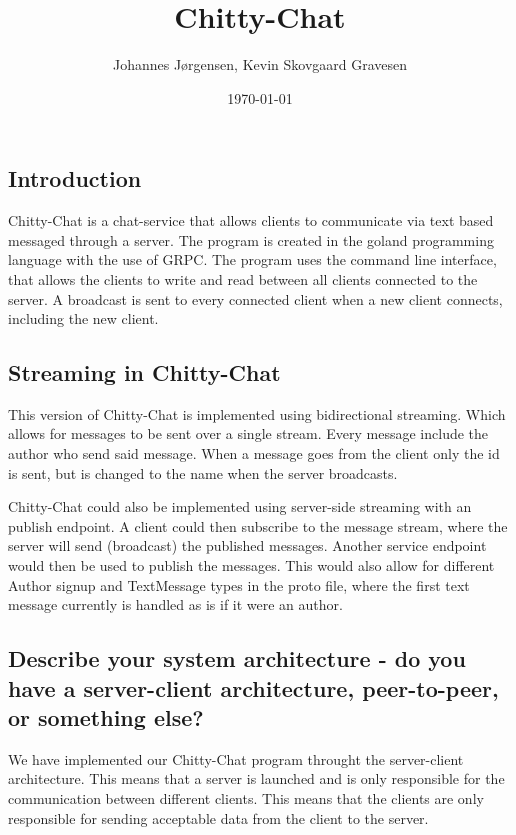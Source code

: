 \documentclass[a4paper,11pt]{article}
\title{Chitty-Chat}
\author{Johannes Jørgensen, Kevin Skovgaard Gravesen}
\date{\today}
\begin{document}
 

\maketitle

\subsection*{Introduction}
Chitty-Chat is a chat-service that allows clients to communicate via text based messaged through a server. The program is created in the goland programming language with the use of GRPC.
The program uses the command line interface, that allows the clients to write and read between all clients connected to the server.
A broadcast is sent to every connected client when a new client connects, including the new client.

\subsection*{Streaming in Chitty-Chat}
This version of Chitty-Chat is implemented using bidirectional streaming. Which allows for messages to be sent over a single stream.
Every message include the author who send said message. When a message goes from the client only the id is sent, but is changed to the name when the server broadcasts.

Chitty-Chat could also be implemented using server-side streaming with an publish endpoint.
A client could then subscribe to the message stream, where the server will send (broadcast) the published messages.
Another service endpoint would then be used to publish the messages.
This would also allow for different Author signup and TextMessage types in the proto file, where the first text message currently is handled as is if it were an author.

\subsection*{Describe your system architecture - do you have a server-client architecture, peer-to-peer, or something else?}
We have implemented our Chitty-Chat program throught the server-client architecture. 
This means that a server is launched and is only responsible for the communication between different clients. This means that the clients are only responsible for
sending acceptable data from the client to the server.
\end{document}

